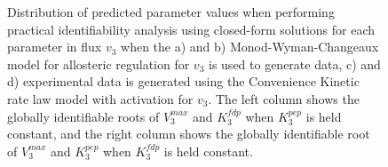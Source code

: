 \documentclass[10pt]{article}
\begin{document}
\begin{figure}[!tbhp]
	\caption{Distribution of predicted parameter values when performing practical identifiability analysis using closed-form solutions for each parameter in flux $v_3$ when the a) and b) Monod-Wyman-Changeaux model for allosteric regulation for $v_3$ is used to generate data, c) and d) experimental data is generated using the Convenience Kinetic rate law model with activation for $v_3$. The left column shows the globally identifiable roots of $V_3^{max}$ and $K_3^{fdp}$ when $K_3^{pep}$ is held constant, and the right column shows the globally identifiable root of $V_3^{max}$ and $K_3^{pep}$ when $K_3^{fdp}$ is held constant.}\label{fig:parameter_value_v3_var}
\end{figure}	
\end{document}
